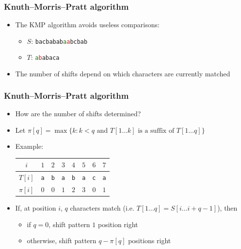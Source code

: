 \documentclass{beamer}
\begin{document}
\begin{frame}[plain]
    \frametitle{Knuth--Morris--Pratt algorithm}
    \begin{itemize}
    \item The KMP algorithm avoids useless comparisons:
        \begin{itemize}
            \item $S$: \texttt{bacbabab\textcolor{green}{a}\textcolor{red}{a}bcbab}
            \item $T$: \texttt{\textcolor{green}{a}\textcolor{red}{b}abaca}
        \end{itemize}
    \item<2-> The number of shifts depend on which characters are currently matched
    \end{itemize}
\end{frame}

\begin{frame}[plain]
    \frametitle{Knuth--Morris--Pratt algorithm}
    \begin{itemize}
        \item How are the number of shifts determined?
            \vspace{5pt}
        \item Let {\footnotesize $\pi[q] = \max \{ k : k < q \textrm{ and } T[1\ldots k] \textrm{ is a suffix of } T[1\ldots q] \}$}
            \vspace{5pt}
        \item<2-> Example:\\
            \begin{center}
                \begin{tabular}{cccccccc}
                    $i$ & $1$ & $2$ & $3$ & $4$ & $5$ & $6$ & $7$ \\
                    \hline
                    $T[i]$&\texttt{a}&\texttt{b}&\texttt{a}&\texttt{b}&\texttt{a}&\texttt{c}&\texttt{a} \\
                    $\pi[i]$ & $0$ & $0$ & $1$ & $2$ & $3$ & $0$ & $1$\\
                \end{tabular}
            \end{center}
    \vspace{5pt}
        \item<3-> If, at position $i$, $q$ characters match (i.e. $T[1\ldots q] = S[i\ldots i+q-1]$), then
            \begin{itemize}
                \item if $q = 0$, shift pattern $1$ position right
                \item otherwise, shift pattern $q - \pi[q]$ positions right
            \end{itemize}
    \end{itemize}
\end{frame}
\end{document}
